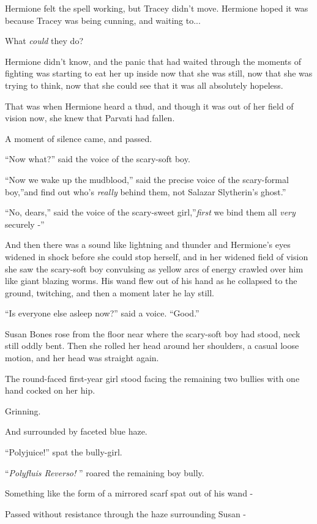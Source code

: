 Hermione felt the spell working, but Tracey didn't move. Hermione hoped
it was because Tracey was being cunning, and waiting to...

What \emph{could} they do?

Hermione didn't know, and the panic that had waited through the moments
of fighting was starting to eat her up inside now that she was still,
now that she was trying to think, now that she could see that it was all
absolutely hopeless.

That was when Hermione heard a thud, and though it was out of her field
of vision now, she knew that Parvati had fallen.

A moment of silence came, and passed.

``Now what?'' said the voice of the scary-soft boy.

``Now we wake up the mudblood,'' said the precise voice of the
scary-formal boy,''and find out who's \emph{really} behind them, not
Salazar Slytherin's ghost.''

``No, dears,'' said the voice of the scary-sweet girl,''\emph{first} we
bind them all \emph{very} securely -''

And then there was a sound like lightning and thunder and Hermione's
eyes widened in shock before she could stop herself, and in her widened
field of vision she saw the scary-soft boy convulsing as yellow arcs of
energy crawled over him like giant blazing worms. His wand flew out of
his hand as he collapsed to the ground, twitching, and then a moment
later he lay still.

``Is everyone else asleep now?'' said a voice. ``Good.''

Susan Bones rose from the floor near where the scary-soft boy had stood,
neck still oddly bent. Then she rolled her head around her shoulders, a
casual loose motion, and her head was straight again.

The round-faced first-year girl stood facing the remaining two bullies
with one hand cocked on her hip.

Grinning.

And surrounded by faceted blue haze.

``Polyjuice!'' spat the bully-girl.

``\emph{Polyfluis Reverso!} '' roared the remaining boy bully.

Something like the form of a mirrored scarf spat out of his wand -

Passed without resistance through the haze surrounding Susan -

